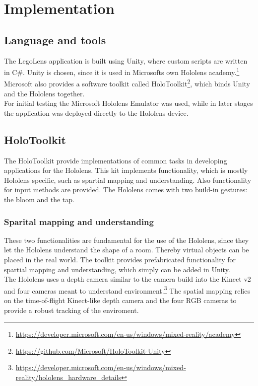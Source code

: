 \section{Implementation}

\subsection{Language and tools}
The LegoLens application is built using Unity, where custom scripts are written in C\#. Unity is chosen, since it is used in Microsofts own Hololens academy.\footnote{\url{https://developer.microsoft.com/en-us/windows/mixed-reality/academy}} Microsoft also provides a software toolkit called HoloToolkit\footnote{\url{https://github.com/Microsoft/HoloToolkit-Unity}}, which binds Unity and the Hololens together. \\
For initial testing the Microsoft Hololens Emulator was used, while in later stages the application was deployed directly to the Hololens device. 

\subsection{HoloToolkit}
The HoloToolkit provide implementations of common tasks in developing applications for the Hololens. This kit implements functionality, which is mostly Hololens specific, such as spartial mapping and understanding. Also functionality for input methods are provided. The Hololens comes with two build-in gestures: the bloom and the tap.\\

\subsubsection{Sparital mapping and understanding}
These two functionalities are fundamental for the use of the Hololens, since they let the Hololens understand the shape of a room. Thereby virtual objects can be placed in the real world. The toolkit provides prefabricated functionality for spartial mapping and understanding, which simply can be added in Unity.  \\
The Hololens uses a depth camera similar to the camera build into the Kinect v2 and four cameras meant to understand environment.\footnote{\url{https://developer.microsoft.com/en-us/windows/mixed-reality/hololens_hardware_details}} The spatial mapping relies on the time-of-flight Kinect-like depth camera and the four RGB cameras to provide a robust tracking of the enviroment. 

